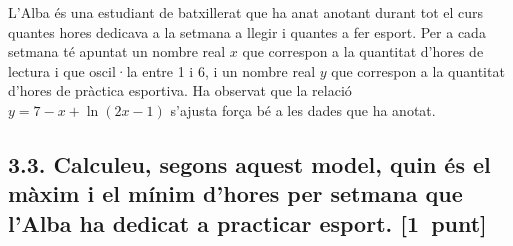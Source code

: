 \documentclass[11pt,a4paper]{article}
\begin{document}
\vspace{0.6em}
\noindent L'Alba és una estudiant de batxillerat que ha anat anotant durant tot el curs quantes hores dedicava a la setmana a llegir i quantes a fer esport. Per a cada setmana té apuntat un nombre real $x$ que correspon a la quantitat d'hores de lectura i que oscil·la entre 1 i 6, i un nombre real $y$ que correspon a la quantitat d'hores de pràctica esportiva. Ha observat que la relació $y = 7 - x + \ln(2x - 1)$ s'ajusta força bé a les dades que ha anotat.

\subsection*{3.3. \normalfont Calculeu, segons aquest model, quin és el màxim i el mínim d'hores per setmana que l'Alba ha dedicat a practicar esport. \hspace*{\fill}\textnormal{[1~punt]}}

\end{document}
